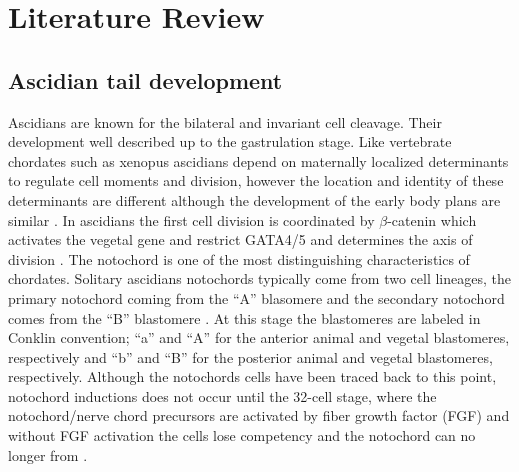\chapter{Literature Review}
\section{Ascidian tail development}

Ascidians are known for the bilateral and invariant cell cleavage. Their development well described up to the gastrulation stage\cite{nishida_cell_1983,nishida_cell_1985,nishida_cell_1987}. Like vertebrate chordates such as xenopus ascidians depend on maternally localized determinants to regulate cell moments and division, however the location and identity of these determinants are different although the development of the early body plans are similar \cite{lemaire_ascidians_2008}. In ascidians the first cell division is coordinated by  $\beta$-catenin which activates the vegetal gene and restrict GATA4/5 \cite{} and determines the axis of division \cite{}. 
The notochord is one of the most distinguishing characteristics of chordates. Solitary ascidians notochords typically come from two cell lineages, the primary notochord coming from the ``A'' blasomere and the secondary notochord comes from the ``B'' blastomere \cite{nishida_cell_1983}. At this stage the blastomeres are labeled in Conklin \cite{conklin_organization_1905} convention; ``a'' and ``A'' for the anterior animal and vegetal blastomeres, respectively and ``b'' and ``B'' for the posterior animal and vegetal blastomeres, respectively. Although the notochords cells have been traced back to this point, notochord inductions does not occur until the 32-cell stage, where the notochord/nerve chord precursors are activated by fiber growth factor (FGF) and without FGF activation the cells lose competency and the notochord can no longer from \cite{nakatani_basic_1996,nakatani_duration_1999}. 
